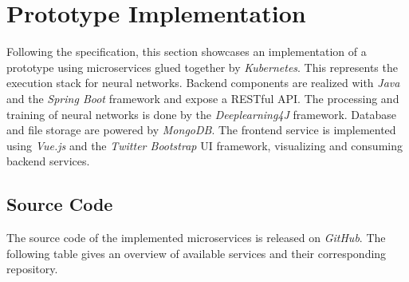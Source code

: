 \chapter{Prototype Implementation}\label{prototype-implementation}

Following the specification, this section showcases an implementation of
a prototype using microservices glued together by \emph{Kubernetes}.
This represents the execution stack for neural networks. Backend
components are realized with \emph{Java} and the \emph{Spring Boot}
framework and expose a RESTful API. The processing and training of
neural networks is done by the \emph{Deeplearning4J} framework. Database
and file storage are powered by \emph{MongoDB}. The frontend service is
implemented using \emph{Vue.js} and the \emph{Twitter Bootstrap} UI
framework, visualizing and consuming backend services.

\section{Source Code}\label{source-code-1}

The source code of the implemented microservices is released on
\emph{GitHub}. The following table gives an overview of available
services and their corresponding repository.

